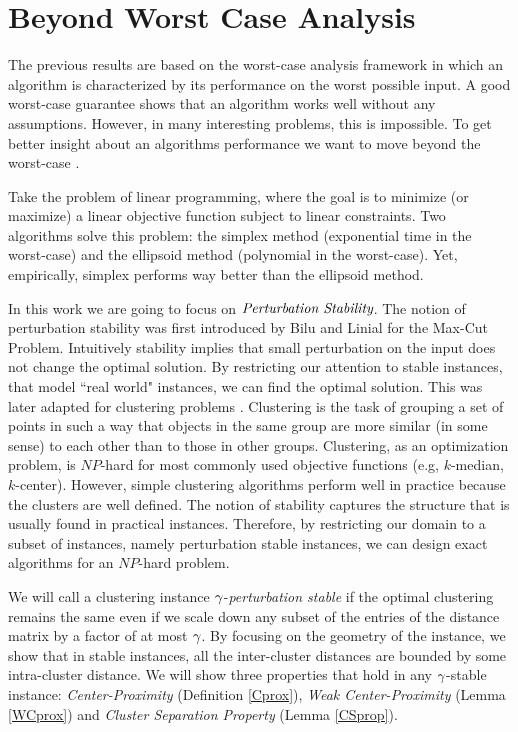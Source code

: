 \section{Beyond Worst Case Analysis}

The previous results are based on the worst-case analysis framework in which an algorithm is characterized by its performance on the worst possible input. A good worst-case guarantee shows that an algorithm works well without any assumptions. However, in many interesting problems, this is impossible. To get better insight about an algorithms performance we want to move beyond the worst-case \cite{Rough20}. 

Take the problem of linear programming, where the goal is to minimize (or maximize) a linear objective function subject to linear constraints. Two algorithms solve this problem: the simplex method (exponential time in the worst-case) and the ellipsoid method (polynomial in the worst-case). Yet, empirically, simplex performs way better than the ellipsoid method. 

In this work we are going to focus on $\emph{Perturbation Stability}$. The notion of perturbation stability was first introduced by Bilu and Linial \cite{Bilu2009} for the Max-Cut Problem. Intuitively stability implies that small perturbation on the input does not change the optimal solution. By restricting our attention to stable instances, that model ``real world" instances, we can find the optimal solution. This was later adapted for clustering problems \cite{Balcan2011, Awasthi2012, Balcan2015, Angelidakis2017,Agarwal2020}. Clustering is the task of grouping a set of points in such a way that objects in the same group are more similar (in some sense) to each other than to those in other groups. Clustering, as an optimization problem, is $NP$-hard for most commonly used objective functions (e.g, $k$-median\cite{Mahajan2012}, $k$-center). However, simple clustering algorithms perform well in practice because the clusters are well defined. The notion of stability captures the structure that is usually found in practical instances. Therefore, by restricting our domain to a subset of instances, namely perturbation stable instances, we can design exact algorithms for an $NP$-hard problem.


We will call a clustering instance $\gamma$-\emph{perturbation stable} if the optimal clustering remains the same even if we scale down any subset of the entries of the distance matrix by a factor of at most $\gamma$. By focusing on the geometry of the instance, we show that in stable instances, all the inter-cluster distances are bounded by some intra-cluster distance. We will show three properties that hold in any $\gamma$-stable instance: \emph{Center-Proximity} (Definition \ref{Cprox}), \emph{Weak Center-Proximity} (Lemma \ref{WCprox}) and \emph{Cluster Separation Property} (Lemma \ref{CSprop}). 

